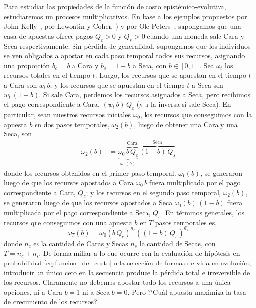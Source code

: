\documentclass[a4paper,11pt]{book}
\theoremstyle{definition}
\begin{document}
Para estudiar las propiedades de la funci\'on de costo epist\'emico-evolutiva, estudiaremos un procesos multiplicativos.
%
En base a los ejemplos propuestos por John Kelly~\cite{kelly1956}, por Lewontin y Cohen~\cite{lewontin1969-randomlyVaryingEnvironment}) y por Ole Peters~\cite{peters2019-ergodicityEconomics}, supongamos que una casa de apuestas ofrece pagos $Q_c > 0$ y $Q_s > 0$ cuando una moneda sale Cara y Seca respectivamente.
%
Sin p\'erdida de generalidad, supongamos que los individuos se ven obligados a apostar en cada paso temporal todos sus recursos, asignando una proporci\'on $b_c = b$ a Cara y $b_s = 1 - b$ a Seca, con $b \in [0,1]$.
%
Sea $\omega_{t}$ los recursos totales en el tiempo $t$.
%
Luego, los recursos que se apuestan en el tiempo $t$ a Cara son $w_t \, b$, y los recursos que se apuestan en el tiempo $t$ a Seca son $w_t \, (1-b)$.
%
Si sale Cara, perdemos los recursos asignados a Seca, pero recibimos el pago correspondiente a Cara, $(w_t \, b)\, Q_c$ (y a la inversa si sale Seca).
%
En particular, sean nuestros recursos iniciales $\omega_0$, los recursos que conseguimos con la apuesta $b$ en dos pasos temporales, $\omega_2(b)$, luego de obtener una Cara y una Seca, son
%
 \begin{equation*}
\begin{split}
\omega_2(b) & = \underbrace{\omega_0 \, \overbrace{b \,  Q_c}^{\text{Cara}}}_{\omega_1(b)} \, \overbrace{(1-b) \, Q_s}^{\text{Seca}}
\end{split}
\end{equation*}
%
donde los recursos obtenidos en el primer paso temporal, $\omega_1(b)$, se generaron luego de que los recursos apostados a Cara $\omega_0\,b$ fuera multiplicada por el pago correspondiente a Cara, $Q_c$; y los recursos en el segundo paso temporal, $\omega_2(b)$, se generaron luego de que los recursos apostados a Seca $\omega_1(b)\,(1-b)$ fuera multiplicada por el pago correspondiente a Seca, $Q_s$.
%
En t\'erminos generales, los recursos que conseguimos con una apuesta $b$ en $T$ pasos temporales es,
%
\begin{equation*}
\omega_T(b) = \omega_0 (b \, Q_c )^{n_c} ((1-b)\,Q_s)^{n_s}
\end{equation*}
%
donde $n_c$ es la cantidad de Caras y Secas $n_s$ la cantidad de Secas, con $T=n_c+n_s$.
%
De forma miliar a lo que ocurre con la evaluaci\'on de hip\'otesis en probabilidad \eqref{eq:funcion_de_costo} o la selecci\'on de formas de vida en evoluci\'on, introducir un \'unico cero en la secuencia produce la p\'erdida total e irreversible de los recursos.
%
Claramente no debemos apostar todo los recursos a una \'unica opciones, ni a Cara $b=1$ ni a Seca $b=0$.
%
Pero ?`Cu\'al apuesta maximiza la tasa de crecimiento de los recursos?
\end{document}
